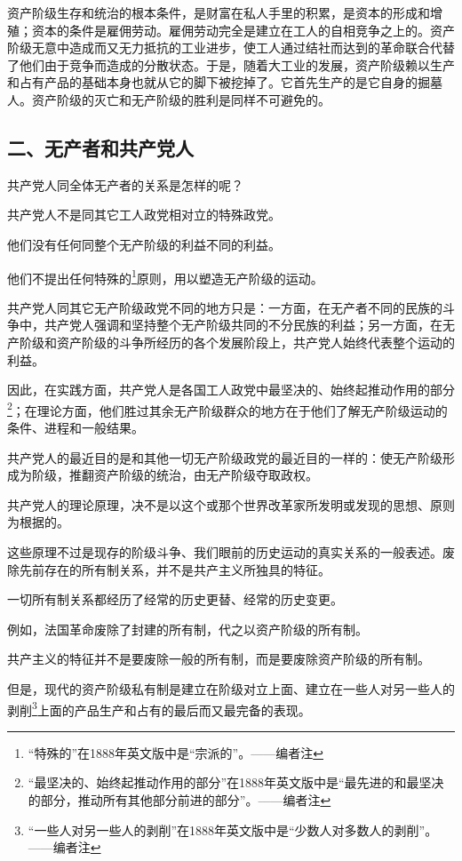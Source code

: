 \documentclass[UTF8,zihao=-4,a4paper]{ctexart}
\begin{document}
资产阶级生存和统治的根本条件，是财富在私人手里的积累，是资本的形成和增殖；资本的条件是雇佣劳动。雇佣劳动完全是建立在工人的自相竞争之上的。资产阶级无意中造成而又无力抵抗的工业进步，使工人通过结社而达到的革命联合代替了他们由于竞争而造成的分散状态。于是，随着大工业的发展，资产阶级赖以生产和占有产品的基础本身也就从它的脚下被挖掉了。它首先生产的是它自身的掘墓人。资产阶级的灭亡和无产阶级的胜利是同样不可避免的。\par
\subsection*{二、无产者和共产党人}
共产党人同全体无产者的关系是怎样的呢？\par
共产党人不是同其它工人政党相对立的特殊政党。\par
他们没有任何同整个无产阶级的利益不同的利益。\par
他们不提出任何特殊的\footnote{“特殊的”在1888年英文版中是“宗派的”。——编者注}原则，用以塑造无产阶级的运动。\par
共产党人同其它无产阶级政党不同的地方只是：一方面，在无产者不同的民族的斗争中，共产党人强调和坚持整个无产阶级共同的不分民族的利益；另一方面，在无产阶级和资产阶级的斗争所经历的各个发展阶段上，共产党人始终代表整个运动的利益。\par
因此，在实践方面，共产党人是各国工人政党中最坚决的、始终起推动作用的部分\footnote{“最坚决的、始终起推动作用的部分”在1888年英文版中是“最先进的和最坚决的部分，推动所有其他部分前进的部分”。——编者注}；在理论方面，他们胜过其余无产阶级群众的地方在于他们了解无产阶级运动的条件、进程和一般结果。\par
共产党人的最近目的是和其他一切无产阶级政党的最近目的一样的：使无产阶级形成为阶级，推翻资产阶级的统治，由无产阶级夺取政权。\par
共产党人的理论原理，决不是以这个或那个世界改革家所发明或发现的思想、原则为根据的。\par
这些原理不过是现存的阶级斗争、我们眼前的历史运动的真实关系的一般表述。废除先前存在的所有制关系，并不是共产主义所独具的特征。\par
一切所有制关系都经历了经常的历史更替、经常的历史变更。\par
例如，法国革命废除了封建的所有制，代之以资产阶级的所有制。\par
共产主义的特征并不是要废除一般的所有制，而是要废除资产阶级的所有制。\par
但是，现代的资产阶级私有制是建立在阶级对立上面、建立在一些人对另一些人的剥削\footnote{“一些人对另一些人的剥削”在1888年英文版中是“少数人对多数人的剥削”。——编者注}上面的产品生产和占有的最后而又最完备的表现。\par
\end{document}
